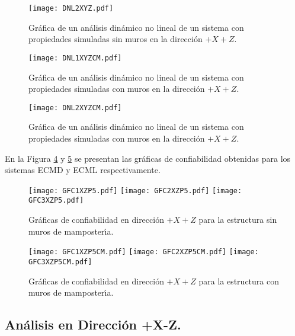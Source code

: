 \begin{figure} [htbp]
\texttt{[image: DNL2XYZ.pdf]}
\caption{Gr\'afica de un an\'alisis din\'amico no lineal de un sistema con propiedades simuladas sin muros en la direcci\'on $+X+Z$.}
\label{fig:apu44}
\end{figure}

\begin{figure} [htbp]
\texttt{[image: DNL1XYZCM.pdf]}
\caption{Gr\'afica de un an\'alisis din\'amico no lineal de un sistema con propiedades simuladas con muros en la direcci\'on $+X+Z$.}
\label{fig:apu45}
\end{figure}

\begin{figure} [htbp]
\texttt{[image: DNL2XYZCM.pdf]}
\caption{Gr\'afica de un an\'alisis din\'amico no lineal de un sistema con propiedades simuladas con muros en la direcci\'on $+X+Z$.}
\label{fig:apu46}
\end{figure}

En la Figura \ref{fig:apu47} y \ref{fig:apu48} se presentan las gr\'aficas de confiabilidad obtenidas para los sistemas ECMD y ECML respectivamente.

\newpage

\begin{figure} [htbp]
\centering
\texttt{[image: GFC1XZP5.pdf]}
\texttt{[image: GFC2XZP5.pdf]}
\texttt{[image: GFC3XZP5.pdf]}
\caption{Gr\'aficas de confiabilidad en direcci\'on $+X+Z$ para la estructura sin muros de mamposter\'{\i}a.}
\label{fig:apu47}
\end{figure}

\begin{figure} [htbp]
\centering
\texttt{[image: GFC1XZP5CM.pdf]}
\texttt{[image: GFC2XZP5CM.pdf]}
\texttt{[image: GFC3XZP5CM.pdf]}
\caption{Gr\'aficas de confiabilidad en direcci\'on $+X+Z$ para la estructura con muros de mamposter\'{\i}a.}
\label{fig:apu48}
\end{figure}

\paragraph{}

\newpage

\subsection{An\'alisis en Direcci\'on +X-Z.}

